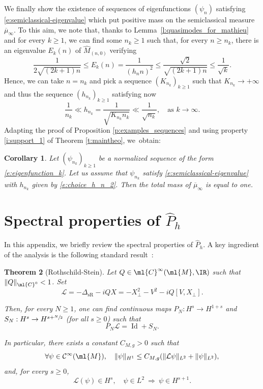 \documentclass[10pt]{amsart}
\theoremstyle{plain}
\newtheorem{theo}{Theorem}[section]
\newtheorem{coro}[theo]{Corollary}
\theoremstyle{definition}
\theoremstyle{remark}
\begin{document}
We finally show the existence of sequences of eigenfunctions $(\psi_n)$ satisfying \eqref{e:semiclassical-eigenvalue} which put positive mass on the semiclassical measure $\overline{\mu}_\infty$. To this aim, we note that, thanks to Lemma~\ref{l:quasimodes_for_mathieu} and for every $k\geq 1$, we can find some $n_k\geq 1$ such that, for every $n\geq n_k$, there is an eigenvalue $E_k(n)$ of $\widehat{M}_{(n,0)}$ verifying
\[
\frac{1}{2\sqrt{(2k+1)n}}\leq E_k(n)=\frac{1}{(h_nn)^2}\leq\frac{\sqrt{2}}{\sqrt{(2k+1)n}}\leq \frac{1}{\sqrt{k}}.
\]
Hence, we can take $n=n_k$ and pick a sequence $(K_{n_k})_{k\geq 1}$ such that $K_{n_k} \to + \infty$ and thus the sequence $(h_{n_k})_{k\geq 1}$ satisfying now
\begin{equation}
\label{e:choice_h_n_2}
\frac{1}{n_k}\ll h_{n_k} = \frac{1}{\sqrt{K_{n_k} n_k }}\ll \frac{1}{\sqrt{n_k}}, \quad \text{as } k \to \infty.
\end{equation}
Adapting the proof of Proposition \ref{p:examples_sequences} and using property \eqref{i:support_1} of Theorem \ref{t:maintheo}, we~obtain:
\begin{coro}
\label{c:examples_sequences}
Let $(\psi_{n_k})_{k\geq 1}$ be a normalized sequence of the form \eqref{e:eigenfunction_k}. Let us assume that $\psi_{n_k}$ satisfy \eqref{e:semiclassical-eigenvalue} with $h_{n_k}$ given by \eqref{e:choice_h_n_2}. Then the total mass of $\overline{\mu}_\infty$ is equal to one.
\end{coro}

\appendix

\section{Spectral properties of \texorpdfstring{$\widehat{P}_h$}{Ph}}
\label{a:spectral}

In this appendix, we briefly review the spectral properties of $\widehat{P}_h$. A key ingredient of the analysis is the following standard result~\cite[Cor.\,17.14]{RothschildStein76}:

\begin{theo}[Rothschild-Stein]\label{t:RothschildStein} Let $Q\in\ml{C}^\infty(\ml{M},\IR)$ such that $\|Q\|_{\ml{C}^0}<1$. Set
\[
\mathcal{L}=-\Delta_{\text{sR}}-iQX=-X_\perp^2-V^2-iQ[V,X_\perp].
\]

Then, for every $N\geq 1$, one can find continuous maps $P_N:H^s\to H^{1+s}$ and $S_N:H^s\to H^{s+\sfrac{N}{2}}$ (for all $s\geq 0$) such that
\[
P_N\mathcal{L}=\operatorname{Id}+S_N.
\]

In particular, there exists a constant $C_{M,g}>0$ such that
\begin{equation}\label{e:RothschildStein}
\forall \psi\in\mathcal{C}^\infty(\ml{M}),\quad\|\psi\|_{H^1}\leq C_{M,g}(\|\mathcal{L}\psi\|_{L^2}+\|\psi\|_{L^2}),
\end{equation}
and, for every $s\geq 0$,
\[
\mathcal{L}(\psi)\in H^s,\quad\psi\in L^2\ \Longrightarrow\ \psi\in H^{s+1}.
\]
\end{theo}
\end{document}
